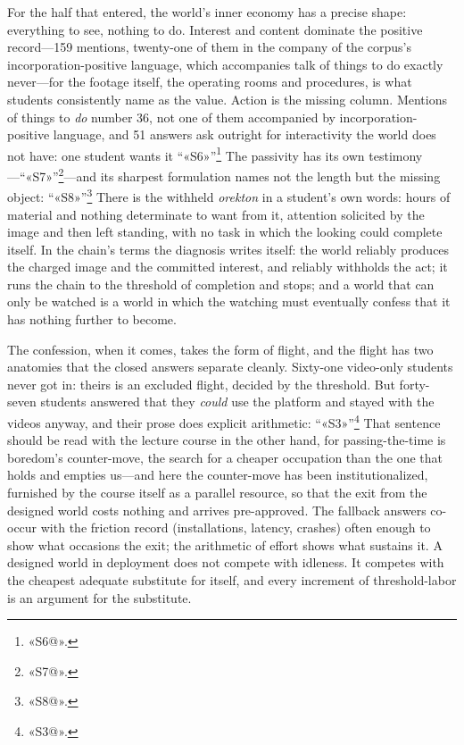 For the half that entered, the world's inner economy has a precise shape: everything to see, nothing to do. Interest and content dominate the positive record---159 mentions, twenty-one of them in the company of the corpus's incorporation-positive language, which accompanies talk of things to do exactly never---for the footage itself, the operating rooms and procedures, is what students consistently name as the value. Action is the missing column. Mentions of things to \textit{do} number 36, not one of them accompanied by incorporation-positive language, and 51 answers ask outright for interactivity the world does not have: one student wants it ``«S6»''\footnote{«S6@».} The passivity has its own testimony---``«S7»''\footnote{«S7@».}---and its sharpest formulation names not the length but the missing object: ``«S8»''\footnote{«S8@».} There is the withheld \textit{orekton} in a student's own words: hours of material and nothing determinate to want from it, attention solicited by the image and then left standing, with no task in which the looking could complete itself. In the chain's terms the diagnosis writes itself: the world reliably produces the charged image and the committed interest, and reliably withholds the act; it runs the chain to the threshold of completion and stops; and a world that can only be watched is a world in which the watching must eventually confess that it has nothing further to become.

The confession, when it comes, takes the form of flight, and the flight has two anatomies that the closed answers separate cleanly. Sixty-one video-only students never got in: theirs is an excluded flight, decided by the threshold. But forty-seven students answered that they \textit{could} use the platform and stayed with the videos anyway, and their prose does explicit arithmetic: ``«S3»''\footnote{«S3@».} That sentence should be read with the lecture course in the other hand, for passing-the-time is boredom's counter-move, the search for a cheaper occupation than the one that holds and empties us---and here the counter-move has been institutionalized, furnished by the course itself as a parallel resource, so that the exit from the designed world costs nothing and arrives pre-approved. The fallback answers co-occur with the friction record (installations, latency, crashes) often enough to show what occasions the exit; the arithmetic of effort shows what sustains it. A designed world in deployment does not compete with idleness. It competes with the cheapest adequate substitute for itself, and every increment of threshold-labor is an argument for the substitute.

